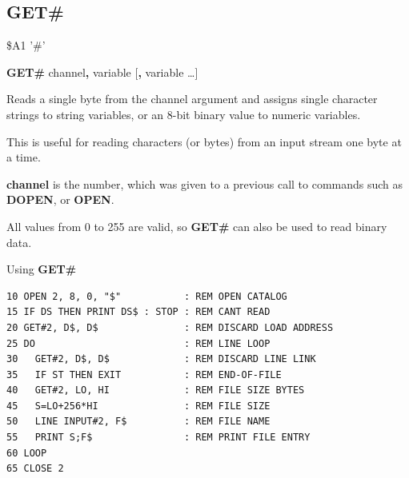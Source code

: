 \subsection{GET\#}
\begin{description}[leftmargin=2cm,style=nextline]
\item [Token:]    \$A1 '\#'

\item [Format:]   {\bf GET\#} channel{\bf,} variable [{\bf,} variable \dots]

\item [Usage:]    Reads a single byte from the channel argument and assigns single character strings to string variables, or an 8-bit binary value to numeric variables.

                  This is useful for reading characters (or bytes) from an input stream one byte at a time.

                  {\bf channel} is the number, which was given to a previous call to commands such as {\bf DOPEN}, or {\bf OPEN}.

\item [Remarks:]  All values from 0 to 255 are valid, so {\bf GET\#} can also be used to read binary data.

\item [Example:]  Using {\bf GET\#}

\begin{tcolorbox}[colback=black,coltext=white]
\verbatimfont{\codefont}
\begin{verbatim}
10 OPEN 2, 8, 0, "$"           : REM OPEN CATALOG
15 IF DS THEN PRINT DS$ : STOP : REM CANT READ
20 GET#2, D$, D$               : REM DISCARD LOAD ADDRESS
25 DO                          : REM LINE LOOP
30   GET#2, D$, D$             : REM DISCARD LINE LINK
35   IF ST THEN EXIT           : REM END-OF-FILE
40   GET#2, LO, HI             : REM FILE SIZE BYTES
45   S=LO+256*HI               : REM FILE SIZE
50   LINE INPUT#2, F$          : REM FILE NAME
55   PRINT S;F$                : REM PRINT FILE ENTRY
60 LOOP
65 CLOSE 2
\end{verbatim}
\end{tcolorbox}
\end{description}


\newpage
